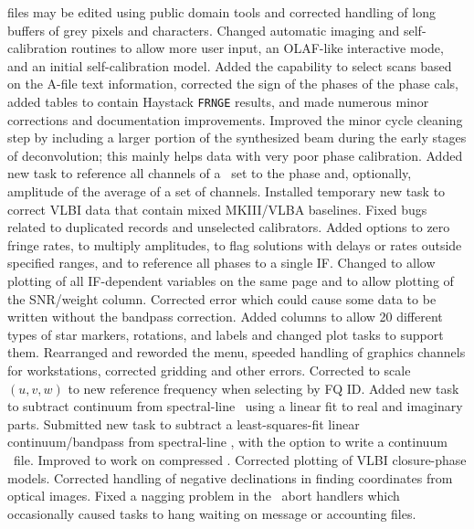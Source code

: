 \begin{description}
   files may be edited using public domain tools and corrected
   handling of long buffers of grey pixels and characters.
 Changed automatic imaging and self-calibration routines
   to allow more user input, an OLAF-like interactive mode, and an
   initial self-calibration model.
 Added the capability to select scans based on the
   A-file text information, corrected the sign of the phases of the
   phase cals, added tables to contain Haystack {\tt FRNGE} results,
   and made numerous minor corrections and documentation improvements.
 Improved the minor cycle cleaning step by including a
   larger portion of the synthesized beam during the early stages of
   deconvolution; this mainly helps data with very poor phase
   calibration.
 Added new task to reference all channels of a \uvdata\
   set to the phase and, optionally, amplitude of the average of a set
   of channels.
 Installed temporary new task to correct VLBI data that
   contain mixed MKIII/VLBA baselines.
 Fixed bugs related to duplicated records and unselected
   calibrators.
 Added options to zero fringe rates, to multiply
   amplitudes, to flag solutions with delays or rates outside
   specified ranges, and to reference all phases to a single IF.
\myitem{SNPLT} Changed to allow plotting of all IF-dependent variables
   on the same page and to allow plotting of the SNR/weight column.
\myitem{SPLIT} Corrected error which could cause some data to be
   written without the bandpass correction.
 Added columns to allow 20 different types of star
   markers, rotations, and labels and changed plot tasks to support
   them.
 Rearranged and reworded the menu, speeded handling of
   graphics channels for workstations, corrected gridding and other
   errors.
 Corrected to scale $(u,v,w)$ to new reference frequency
   when selecting by FQ ID.
 Added new task to subtract continuum from spectral-line
   \uvdata\ using a linear fit to real and imaginary parts.
 Submitted new task to subtract a least-squares-fit
   linear continuum/bandpass from spectral-line \uvdata, with the
   option to write a continuum \uvdata\ file.
 Improved to work on compressed \uvdata.
 Corrected plotting of VLBI closure-phase models.
 Corrected handling of negative declinations in finding
   coordinates from optical images.
 Fixed a nagging problem in the \AIPS\ abort handlers
   which occasionally caused tasks to hang waiting on message or
   accounting files.
\end{description}

